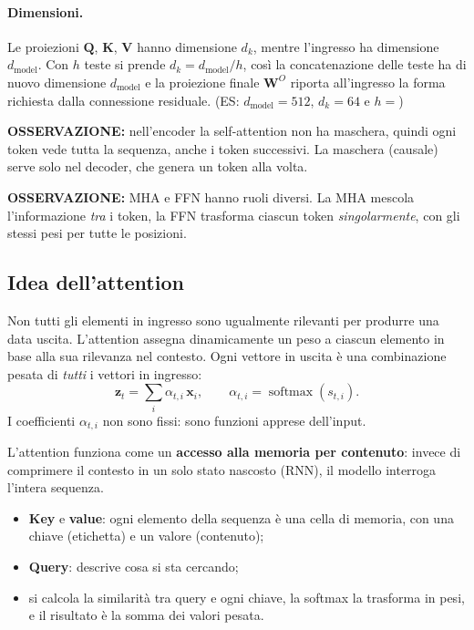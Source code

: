 \documentclass[11pt,a4paper]{article}
\begin{document}
\paragraph{Dimensioni.} Le proiezioni $\mathbf{Q}$, $\mathbf{K}$, $\mathbf{V}$ hanno dimensione $d_k$, mentre 
l'ingresso ha dimensione $d_{\text{model}}$.
 Con $h$ teste si prende $d_k=d_{\text{model}}/h$, così la concatenazione delle teste ha di nuovo dimensione $d_{\text{model}}$
  e la proiezione finale $\mathbf{W}^O$ riporta all'ingresso la forma richiesta dalla connessione residuale.
  (ES: $d_{\text{model}}=512$, $d_k=64$ e $h=$)

\textbf{OSSERVAZIONE:} nell'encoder la self-attention non ha maschera, quindi ogni token vede tutta la sequenza, 
anche i token successivi. La maschera (causale) serve solo nel decoder, che genera un token alla volta.

\textbf{OSSERVAZIONE:} MHA e FFN hanno ruoli diversi. La MHA mescola l'informazione \emph{tra} i token, 
la FFN trasforma ciascun token \emph{singolarmente}, con gli stessi pesi per tutte le posizioni.

\subsection{Idea dell'attention}

Non tutti gli elementi in ingresso sono ugualmente rilevanti per produrre una data uscita. L'attention
 assegna dinamicamente un peso a ciascun elemento in base alla sua rilevanza nel contesto. 
 Ogni vettore in uscita è una combinazione pesata di \emph{tutti} i vettori in ingresso:
\[
\mathbf{z}_t = \sum_i \alpha_{t,i}\,\mathbf{x}_i, \qquad \alpha_{t,i} = \operatorname{softmax}(s_{t,i}).
\]
I coefficienti $\alpha_{t,i}$ non sono fissi: sono funzioni apprese dell'input.

L'attention funziona come un \textbf{accesso alla memoria per contenuto}: invece di comprimere il contesto 
in un solo stato nascosto (RNN), il modello interroga l'intera sequenza.
\begin{itemize}
    \item \textbf{Key} e \textbf{value}: ogni elemento della sequenza è una cella di memoria, con una chiave 
    (etichetta) e un valore (contenuto);
    \item \textbf{Query}: descrive cosa si sta cercando;
    \item si calcola la similarità tra query e ogni chiave, la softmax la trasforma in pesi, e il risultato è 
    la somma dei valori pesata.
\end{itemize}
\end{document}
